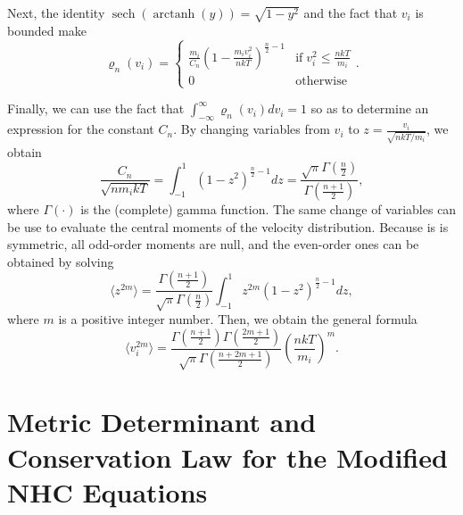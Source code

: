 \documentclass[
aip,
jcp,
reprint,
]{revtex4-1}
\DeclareMathOperator\arctanh{arctanh}
\DeclareMathOperator\sech{sech}
\begin{document}

Next, the identity $\sech(\arctanh(y)) = \sqrt{1-y^2}$ and the fact that $v_i$ is bounded make
\begin{equation*}
\varrho_n(v_i) = \begin{cases}
\frac{m_i}{C_n} \left(1-\frac{m_i v_i^2}{n k T}\right)^{\frac{n}{2} - 1} & \mathrm{if} \; v_i^2 \leq \frac{n k T}{m_i} \\
0 & \mathrm{otherwise}
\end{cases}.
\end{equation*}

Finally, we can use the fact that $\int_{-\infty}^\infty \varrho_n(v_i) dv_i = 1$ so as to determine an expression for the constant $C_n$.
By changing variables from $v_i$ to $z = \frac{v_i}{\sqrt{{n k T}/{m_i}}}$, we obtain
\begin{equation}
\frac{C_n}{\sqrt{n m_i k T}} = \int_{-1}^{1} (1-z^2)^{\frac{n}{2}-1} dz = \frac{\sqrt{\pi} \Gamma\left(\frac{n}{2}\right)}{\Gamma\left(\frac{n+1}{2}\right)},
\end{equation}
where $\Gamma(\cdot)$ is the (complete) gamma function.
The same change of variables can be use to evaluate the central moments of the velocity distribution.
Because is is symmetric, all odd-order moments are null, and the even-order ones can be obtained by solving
\begin{equation}
\langle z^{2m} \rangle = \frac{\Gamma\left(\frac{n+1}{2}\right)}{\sqrt{\pi} \Gamma\left(\frac{n}{2}\right)} \int_{-1}^{1} z^{2m} (1-z^2)^{\frac{n}{2}-1} dz,
\end{equation}
where $m$ is a positive integer number.
Then, we obtain the general formula
\begin{equation}
\langle v_i^{2m} \rangle = \frac{\Gamma\left(\frac{n+1}{2}\right) \Gamma\left(\frac{2m+1}{2}\right)}{\sqrt{\pi}\Gamma\left(\frac{n+2m+1}{2}\right)} \left(\frac{n k T}{m_i}\right)^m.
\end{equation}

\section{Metric Determinant and Conservation Law for the Modified NHC Equations}
\label{sec:adapted NHC proofs}
\end{document}
